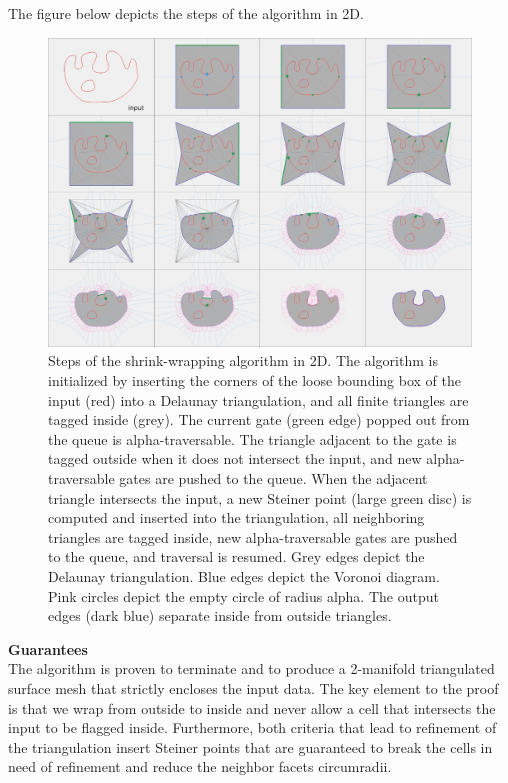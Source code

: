 \documentclass[12pt]{article}
\begin{document}
The figure below depicts the steps of the algorithm in 2D.
\begin{figure}[H]
    \centering
        \centering
        \includegraphics[width=\textwidth]{images/aw3_steps.jpg}
        \caption{Steps of the shrink-wrapping algorithm in 2D. The algorithm is initialized by
        inserting the corners of the loose bounding box of the input (red) into a Delaunay
        triangulation, and all finite triangles are tagged inside (grey). The current gate
        (green edge) popped out from the queue is alpha-traversable. The triangle adjacent
        to the gate is tagged outside when it does not intersect the input, and new
        alpha-traversable gates are pushed to the queue. When the adjacent triangle
        intersects the input, a new Steiner point (large green disc) is computed and inserted
        into the triangulation, all neighboring triangles are tagged inside, new
        alpha-traversable gates are pushed to the queue, and traversal is resumed. Grey edges
        depict the Delaunay triangulation. Blue edges depict the Voronoi diagram. Pink circles
        depict the empty circle of radius alpha. The output edges (dark blue) separate inside
        from outside triangles.
        }
\end{figure}

\textbf{Guarantees} \\
The algorithm is proven to terminate and to produce a 2-manifold triangulated surface
mesh that strictly encloses the input data. The key element to the proof is that we wrap
from outside to inside and never allow a cell that intersects the input to be flagged
inside. Furthermore, both criteria that lead to refinement of the triangulation insert
 Steiner points that are guaranteed to break the cells in need of refinement and
 reduce the neighbor facets circumradii.
\end{document}
